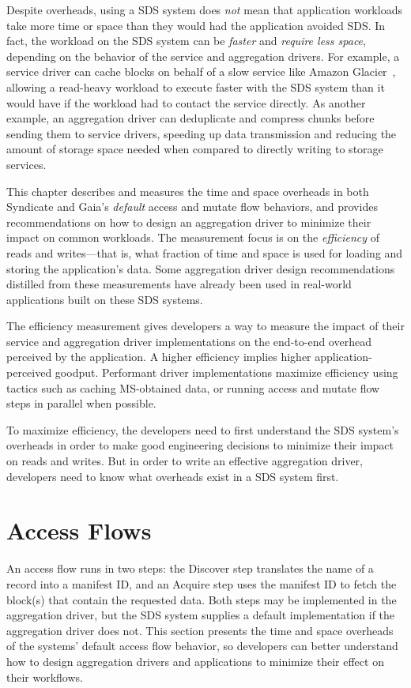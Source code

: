 Despite overheads, using a SDS system does \emph{not} mean that application workloads take more time or
space than they would had the application avoided SDS.  In fact,
the workload on the SDS system can be \emph{faster} and \emph{require less
space}, depending on the behavior of the service and aggregation drivers.
For example, a service driver can cache blocks on behalf of a slow service like Amazon Glacier~\cite{amazon-glacier},
allowing a read-heavy workload to execute faster with the SDS system
than it would have if the workload had to contact the service directly.
As another example, an aggregation driver can deduplicate
and compress chunks before sending them to service drivers, speeding up data
transmission and reducing the amount of storage space needed when compared to
directly writing to storage services.

This chapter describes and measures the time and space overheads in both
Syndicate and Gaia's \emph{default} access and mutate flow behaviors, and
provides recommendations on how to design an aggregation driver to minimize
their impact on common workloads.  The measurement focus is on the
\emph{efficiency} of reads and writes---that is, what fraction of time and space
is used for loading and storing the application's data.
Some aggregation driver design recommendations distilled from
these measurements have already been used in real-world applications built
on these SDS systems.

The efficiency measurement gives developers a way to
measure the impact of their service and aggregation driver implementations on
the end-to-end overhead perceived by the application.
A higher efficiency implies higher application-perceived goodput.  Performant
driver implementations maximize efficiency using tactics such as caching
MS-obtained data, or running access and mutate flow steps in parallel when
possible.

To maximize efficiency, the developers need to first understand the SDS system's
overheads in order to make good engineering decisions to minimize their
impact on reads and writes.  But in order to write an effective aggregation
driver, developers need to know what overheads exist in a SDS system first.

\section{Access Flows}

An access flow runs in two steps:  the Discover step translates the
name of a record into a manifest ID, and an Acquire step uses the manifest
ID to fetch the block(s) that contain the requested data.  Both steps may be
implemented in the aggregation driver, but the SDS system supplies a default
implementation if the aggregation driver does not.
This section presents the time and space overheads of the systems' default
access flow behavior, so developers can better understand how to design
aggregation drivers and applications to minimize their effect on their
workflows.


